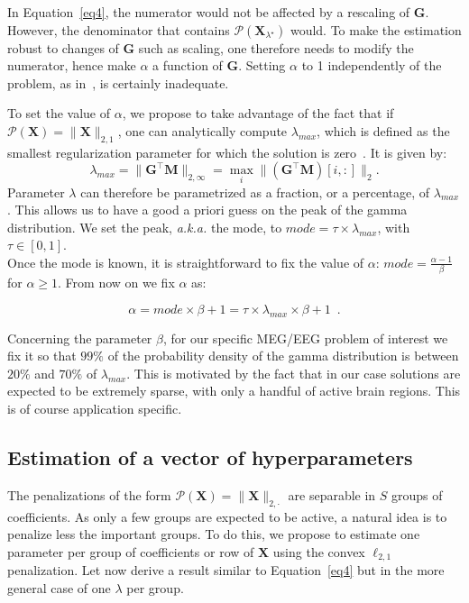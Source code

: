 In Equation~\eqref{eq4}, the numerator would not be affected by a rescaling of $\mathbf{G}$. However, the denominator that contains $\mathcal{P}(\mathbf{X}_{\lambda^\star})$ would. To make the estimation robust to changes of $\mathbf{G}$ such as scaling, one therefore needs to modify the numerator, hence make $\alpha$ a function of $\mathbf{G}$. Setting $\alpha$ to 1 independently of the problem, as in~\cite{Figueiredo}, is certainly inadequate.

To set the value of $\alpha$, we propose to take advantage of the fact that if $\mathcal{P}(\mathbf{X})=\|\mathbf{X}\|_{2,1}$, one can analytically compute $\lambda_{max}$, which is defined as the smallest regularization parameter for which the solution is zero~\cite{bach2012optimization}. It is given by:
\begin{equation}
\lambda_{max} = \|\mathbf{G}^\top\mathbf{M}\|_{2,\infty}=\max_i \|(\mathbf{G}^\top\mathbf{M})[i, :]\|_2.
\end{equation}
Parameter $\lambda$ can therefore be parametrized as a fraction, or a percentage, of $\lambda_{max}$.
This allows us to have a good a priori guess on the peak of the gamma distribution. We set the peak, \textit{a.k.a.} the mode, to $mode=\tau\times\lambda_{max}$, with $\tau\in[0,1]$.
\\

Once the mode is known, it is straightforward to fix the value of $\alpha$: $mode =\frac{\alpha - 1}{\beta}$ for $\alpha \ge 1$. From now on we fix $\alpha$ as:

\begin{equation}
\alpha = mode \times \beta + 1 = \tau\times \lambda_{max} \times \beta + 1 \enspace .
\end{equation}

Concerning the parameter $\beta$, for our specific MEG/EEG problem of interest we fix it so that $99\%$ of the probability density of the gamma distribution is between $20\%$ and $70\%$ of $\lambda_{max}$. This is motivated by the fact that in our case solutions are expected to be extremely sparse, with only a handful of active brain regions. This is of course application specific.
 
\subsection{Estimation of a vector of hyperparameters}

The penalizations of the form $\mathcal{P}(\mathbf{X})=\|\mathbf{X}\|_{2,\cdot}$ are separable in $S$ groups of coefficients.
As only a few groups are expected to be active, a natural idea is to penalize less the important groups. To do this, we propose to estimate one parameter per group of coefficients or row of $\mathbf{X}$ using the convex $\ell_{2,1}$ penalization. Let now derive a result similar to Equation~\eqref{eq4} but in the more general case of one $\lambda$ per group.

